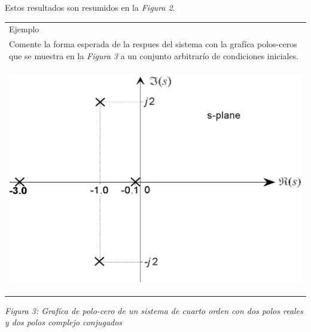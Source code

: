 \documentclass[10pt,a4paper]{article}
\begin{document}
Estos resultados son resumidos en la \textit{Figura 2}.
\clearpage
\begin{center}
  \begin{tabular}{p{16cm}}
    \hline
    Ejemplo\\
    Comente la forma esperada de la respues del sistema con la grafíca polos-ceros que se muestra en la \textit{Figura 3} a un conjunto arbitrarío de condiciones iniciales.\\
    \begin{center}
      \includegraphics[scale=0.2]{img/figura3.png}
    \end{center}
  \end{tabular}
\end{center}
\textit{Figura 3: Grafíca de polo-cero de un sistema de cuarto orden con dos polos reales y dos polos complejo conjugados}
\end{document}

